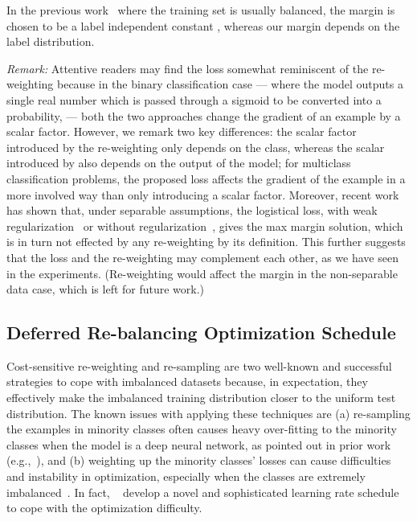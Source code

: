 \documentclass{article}
\begin{document}
In the previous work~\citep{liu2016large,liu2017sphereface,wang2018additive} where the training set is usually balanced, the margin  is chosen to be a label independent constant , whereas our margin depends on the label distribution. 

\textit{Remark:} Attentive readers may find the loss   somewhat reminiscent of the re-weighting because in the binary classification case --- where the model outputs a single real number which is passed through a sigmoid to be converted into a probability, ---  both the two approaches change the gradient of an example by a scalar factor. However, we remark two key differences: the scalar factor introduced by the re-weighting only depends on the class, whereas the scalar introduced by  also depends on the output of the model; for multiclass classification problems, the proposed loss  affects the gradient of the example in a more involved way than only introducing a scalar factor. Moreover, recent work has shown that, under separable assumptions, the logistical loss, with weak regularization~\citep{wei2018margin} or without regularization~\citep{soudry2018implicit}, gives the max margin solution, which is in turn not effected by any re-weighting by its definition. This further suggests that the loss  and the re-weighting may complement each other, as we have seen in the experiments. (Re-weighting would affect the margin in the non-separable data case, which is left for future work.)

\subsection{Deferred Re-balancing Optimization Schedule} \label{sec:schedule}

Cost-sensitive re-weighting and re-sampling are two well-known and successful strategies to cope with imbalanced datasets because, in expectation, they effectively make the imbalanced training distribution closer to the uniform test distribution. The known issues with applying these techniques are (a) re-sampling the examples in minority classes often causes heavy over-fitting to the minority classes when the model is a deep neural network, as pointed out in prior work (e.g.,~\citep{cui2019classbalancedloss}), and (b) weighting up the minority classes' losses can cause difficulties and instability in optimization, especially when the classes are extremely imbalanced~\citep{cui2019classbalancedloss, huang2016learning}. In fact, ~\citet{cui2019classbalancedloss} develop a novel and sophisticated learning rate schedule to cope with the optimization difficulty. 
\end{document}

